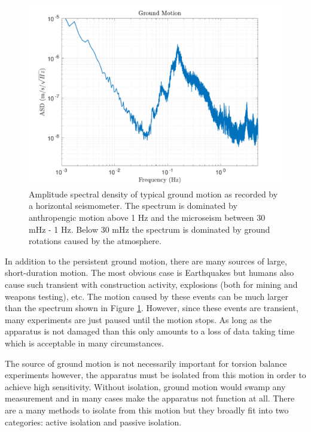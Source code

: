 \documentclass{book}
\begin{document}
\begin{figure}[!h]
\begin{centering}
\includegraphics[width=\textwidth]{GroundSpectrum.pdf}
\caption{Amplitude spectral density of typical ground motion as recorded by a horizontal seismometer. \cite{ross2020precision} The spectrum is dominated by anthropengic motion above 1 Hz and the microseism between 30 mHz - 1 Hz. Below 30 mHz the spectrum is dominated by ground rotations caused by the atmosphere.}\label{groundSpec}
\end{centering}
\end{figure}

In addition to the persistent ground motion, there are many sources of large, short-duration motion. The most obvious case is Earthquakes but humans also cause such transient with construction activity, explosions (both for mining and weapons testing), etc. The motion caused by these events can be much larger than the spectrum shown in Figure \ref{groundSpec}. However, since these events are transient, many experiments are just paused until the motion stops. As long as the apparatus is not damaged than this only amounts to a loss of data taking time which is acceptable in many circumstances.

The source of ground motion is not necessarily important for torsion balance experiments however, the apparatus must be isolated from this motion in order to achieve high sensitivity. Without isolation, ground motion would swamp any measurement and in many cases make the apparatus not function at all. There are a many methods to isolate from this motion but they broadly fit into two categories: active isolation and passive isolation. 
\end{document}
